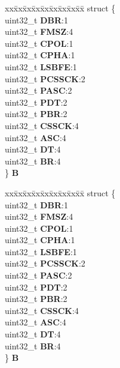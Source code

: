 \begin{DoxyCompactItemize}
\begin{tabbing}
\end{tabbing}\item 
\mbox{\label{unionDSPI__tag_1_1DSPI__CTAR__tag_a308cd20ee8c13877b32d3a09db5d2179}} 
\begin{tabbing}
xx\=xx\=xx\=xx\=xx\=xx\=xx\=xx\=xx\=\kill
struct \{\\
\>uint32\_t {\bfseries DBR}:1\\
\>uint32\_t {\bfseries FMSZ}:4\\
\>uint32\_t {\bfseries CPOL}:1\\
\>uint32\_t {\bfseries CPHA}:1\\
\>uint32\_t {\bfseries LSBFE}:1\\
\>uint32\_t {\bfseries PCSSCK}:2\\
\>uint32\_t {\bfseries PASC}:2\\
\>uint32\_t {\bfseries PDT}:2\\
\>uint32\_t {\bfseries PBR}:2\\
\>uint32\_t {\bfseries CSSCK}:4\\
\>uint32\_t {\bfseries ASC}:4\\
\>uint32\_t {\bfseries DT}:4\\
\>uint32\_t {\bfseries BR}:4\\
\} {\bfseries B}\\

\end{tabbing}\item 
\mbox{\label{unionDSPI__tag_1_1DSPI__CTAR__tag_ace18e9270319658331d1b7c3863db2fc}} 
\begin{tabbing}
xx\=xx\=xx\=xx\=xx\=xx\=xx\=xx\=xx\=\kill
struct \{\\
\>uint32\_t {\bfseries DBR}:1\\
\>uint32\_t {\bfseries FMSZ}:4\\
\>uint32\_t {\bfseries CPOL}:1\\
\>uint32\_t {\bfseries CPHA}:1\\
\>uint32\_t {\bfseries LSBFE}:1\\
\>uint32\_t {\bfseries PCSSCK}:2\\
\>uint32\_t {\bfseries PASC}:2\\
\>uint32\_t {\bfseries PDT}:2\\
\>uint32\_t {\bfseries PBR}:2\\
\>uint32\_t {\bfseries CSSCK}:4\\
\>uint32\_t {\bfseries ASC}:4\\
\>uint32\_t {\bfseries DT}:4\\
\>uint32\_t {\bfseries BR}:4\\
\} {\bfseries B}\\


\end{tabbing}
\end{DoxyCompactItemize}
